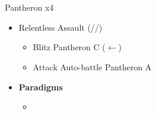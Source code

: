 \chapter[Chapter 4]{}
\begin{multicols}{2}
\renewcommand{\first}{[1] Relentless Assault (\com/\rav/\rav)}

\begin{battle}{Pantheron x4}
\begin{itemize}
    \item \first
    \begin{itemize}
        \item Blitz Pantheron C ($\leftarrow$)
        \item Attack Auto-battle Pantheron A
    \end{itemize}
\end{itemize}
\end{battle}

\vfill
\begin{menu}
\begin{itemize}
    \item \textbf{Paradigms}
    \begin{itemize}
        \item {}%
{\paradigmline{\rav}{\rav}{}}%
{\paradigmline{\syn}{\sab}{}}%
{\paradigmline{\rav}{\med}{}}%
{\paradigmline[4]{\textit{\rav}}{\textit{[\sab]}}{}}%
{\paradigmline{[\rav]}{\rav}{}}
    \end{itemize}
    \columnbreak

\end{itemize}
\end{menu}
\end{multicols}


